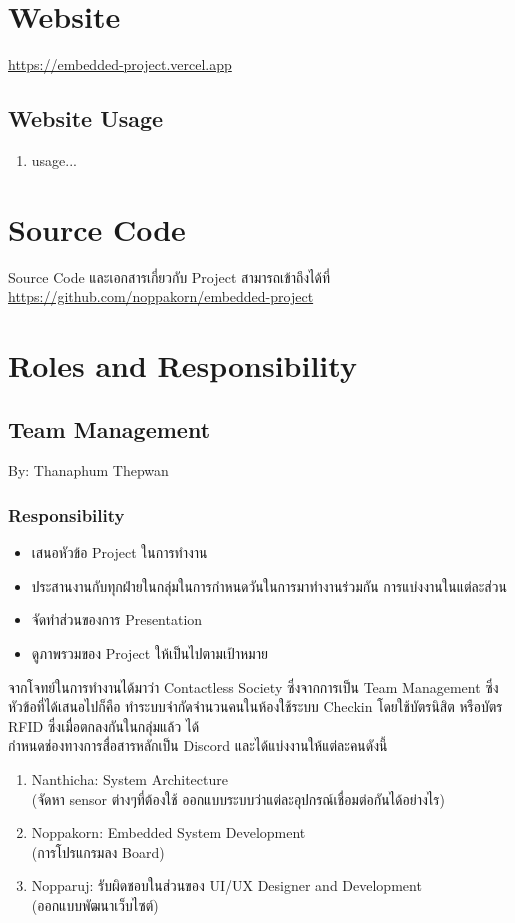 \documentclass[fontsize=14pt]{extarticle}
\begin{document}
\section{Website}
\url{https://embedded-project.vercel.app}
\subsection{Website Usage}
\begin{enumerate}
    \item usage...
\end{enumerate}
\section{Source Code}
Source Code และเอกสารเกี่ยวกับ Project สามารถเข้าถึงได้ที่ \url{https://github.com/noppakorn/embedded-project}
\pagebreak
\section{Roles and Responsibility}
\subsection{Team Management}
By: Thanaphum Thepwan\\
\subsubsection{Responsibility}
\begin{itemize}
    \item เสนอหัวข้อ Project ในการทำงาน
    \item ประสานงานกับทุกฝ่ายในกลุ่มในการกำหนดวันในการมาทำงานร่วมกัน การแบ่งงานในแต่ละส่วน
    \item จัดทำส่วนของการ Presentation
    \item ดูภาพรวมของ Project ให้เป็นไปตามเป้าหมาย
\end{itemize}
จากโจทย์ในการทำงานได้มาว่า Contactless Society ซึ่งจากการเป็น Team Management ซึ่งหัวข้อที่ได้เสนอไปก็คือ ทำระบบจำกัดจำนวนคนในห้องใช้ระบบ Checkin โดยใช้บัตรนิสิต หรือบัตร RFID ซึ่งเมื่อตกลงกันในกลุ่มแล้ว ได้ \\
กำหนดช่องทางการสื่อสารหลักเป็น Discord และได้แบ่งงานให้แต่ละคนดังนี้
\begin{enumerate}
    \item Nanthicha: System Architecture\\ (จัดหา sensor ต่างๆที่ต้องใช้ ออกแบบระบบว่าแต่ละอุปกรณ์เชื่อมต่อกันได้อย่างไร)
    \item Noppakorn: Embedded System Development \\ (การโปรแกรมลง Board)
    \item Nopparuj: รับผิดชอบในส่วนของ UI/UX Designer and Development\\ (ออกแบบพัฒนาเว็บไซต์)
\end{enumerate}
\end{document}
